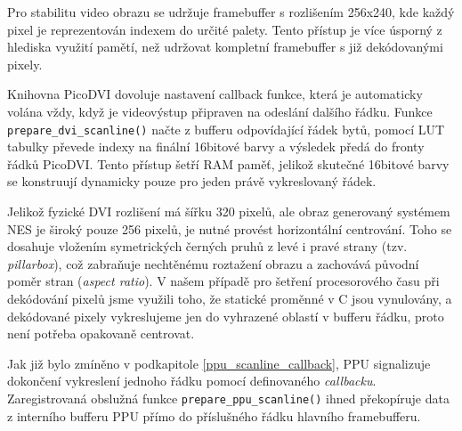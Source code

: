 Pro stabilitu video obrazu se udržuje framebuffer s rozlišením 256x240, kde každý pixel je
reprezentován indexem do určité palety. Tento přístup je více úsporný z hlediska využití pamětí, než
udržovat kompletní framebuffer s již dekódovanými pixely.

Knihovna PicoDVI dovoluje nastavení callback funkce, která je automaticky volána vždy, když je
videovýstup připraven na odeslání dalšího řádku. Funkce \texttt{prepare\_dvi\_scanline()} načte z
bufferu odpovídající řádek bytů, pomocí LUT tabulky převede indexy na finální 16bitové barvy a
výsledek předá do fronty řádků PicoDVI. Tento přístup šetří RAM paměť, jelikož skutečné 16bitové
barvy se konstruují dynamicky pouze pro jeden právě vykreslovaný řádek.

Jelikož fyzické DVI rozlišení má šířku 320 pixelů, ale obraz generovaný systémem NES je široký pouze
256 pixelů, je nutné provést horizontální centrování. Toho se dosahuje vložením symetrických černých
pruhů z levé i pravé strany (tzv. \textit{pillarbox}), což zabraňuje nechtěnému roztažení obrazu a
zachovává původní poměr stran (\textit{aspect ratio}). V našem případě pro šetření procesorového
času při dekódování pixelů jsme využili toho, že statické proměnné v C jsou vynulovány, a dekódované
pixely vykreslujeme jen do vyhrazené oblastí v bufferu řádku, proto není potřeba opakovaně centrovat.

Jak již bylo zmíněno v podkapitole \ref{ppu_scanline_callback}, PPU signalizuje dokončení vykreslení
jednoho řádku pomocí definovaného \textit{callbacku}. Zaregistrovaná obslužná funkce
\texttt{prepare\_ppu\_scanline()} ihned překopíruje data z interního bufferu PPU přímo do
příslušného řádku hlavního framebufferu.
